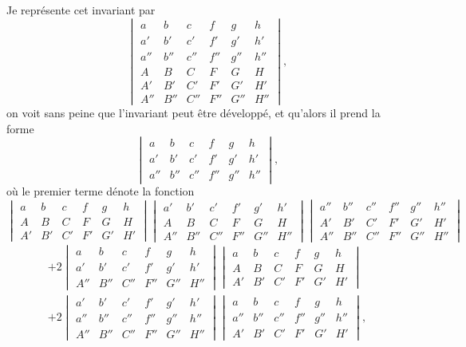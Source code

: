 \documentclass[11pt,a4paper]{book}
\begin{document}
Je repr\'{e}sente cet invariant par
\[
\begin{vmatrix}
a & b & c & f & g & h \\
a' & b' & c' & f' & g' & h' \\
a'' & b'' & c'' & f'' & g'' & h'' \\
A & B & C & F & G & H \\
A' & B' & C' & F' & G' & H' \\
A'' & B'' & C'' & F'' & G'' & H''
\end{vmatrix},
\]
\newpage
\noindent on voit sans peine que l'invariant peut \^{e}tre d\'{e}velopp\'{e}, et qu'alors il prend
la forme
\[
\begin{vmatrix}
a & b & c & f & g & h \\
a' & b' & c' & f' & g' & h' \\
a'' & b'' & c'' & f'' & g'' & h''
\end{vmatrix},
\]
o\`{u} le premier terme d\'{e}note la fonction
\[
\begin{vmatrix}
a & b & c & f & g & h \\
A & B & C & F & G & H \\
A' & B' & C' & F' & G' & H'
\end{vmatrix}
\begin{vmatrix}
a' & b' & c' & f' & g' & h' \\
A & B & C & F & G & H \\
A'' & B'' & C'' & F'' & G'' & H''
\end{vmatrix}
\begin{vmatrix}
a'' & b'' & c'' & f'' & g'' & h'' \\
A' & B' & C' & F' & G' & H' \\
A'' & B'' & C'' & F'' & G'' & H''
\end{vmatrix}
\]
\begin{multline*}
+ 2\begin{vmatrix}a & b & c & f & g & h \\ a' & b' & c' & f' & g' & h' \\ A'' & B'' & C'' & F'' & G'' & H''\end{vmatrix}
\begin{vmatrix}a & b & c & f & g & h \\ A & B & C & F & G & H \\ A' & B' & C' & F' & G' & H'\end{vmatrix} \\
+ 2\begin{vmatrix}a' & b' & c' & f' & g' & h' \\ a'' & b'' & c'' & f'' & g'' & h'' \\ A'' & B'' & C'' & F'' & G'' & H''\end{vmatrix}
\begin{vmatrix}a & b & c & f & g & h \\ a'' & b'' & c'' & f'' & g'' & h'' \\ A' & B' & C' & F' & G' & H'\end{vmatrix},
\end{multline*}
\end{document}
